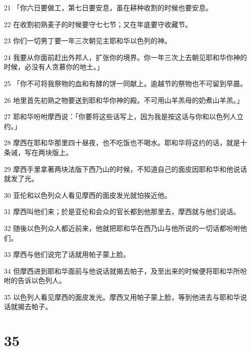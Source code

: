 \par 21 「你六日要做工，第七日要安息，虽在耕种收割的时候也要安息。
\par 22 在收割初熟麦子的时候要守七七节；又在年底要守收藏节。
\par 23 你们一切男丁要一年三次朝见主耶和华以色列的神。
\par 24 我要从你面前赶出外邦人，扩张你的境界。你一年三次上去朝见耶和华你神的时候，必没有人贪慕你的地土。」
\par 25 「你不可将我祭物的血和有酵的饼一同献上。逾越节的祭物也不可留到早晨。
\par 26 地里首先初熟之物要送到耶和华你神的殿。不可用山羊羔母的奶煮山羊羔。」
\par 27 耶和华吩咐摩西说：「你要将这些话写上，因为我是按这话与你和以色列人立约。」
\par 28 摩西在耶和华那里四十昼夜，也不吃饭也不喝水。耶和华将这约的话，就是十条诫，写在两块版上。
\par 29 摩西手里拿著两块法版下西乃山的时候，不知道自己的面皮因耶和华和他说话就发了光。
\par 30 亚伦和以色列众人看见摩西的面皮发光就怕挨近他。
\par 31 摩西叫他们来；於是亚伦和会众的官长都到他那里去，摩西就与他们说话。
\par 32 随後以色列众人都近前来，他就把耶和华在西乃山与他所说的一切话都吩咐他们。
\par 33 摩西与他们说完了话就用帕子蒙上脸。
\par 34 但摩西进到耶和华面前与他说话就揭去帕子，及至出来的时候便将耶和华所吩咐的告诉以色列人。
\par 35 以色列人看见摩西的面皮发光。摩西又用帕子蒙上脸，等到他进去与耶和华说话就揭去帕子。

\chapter{35}

